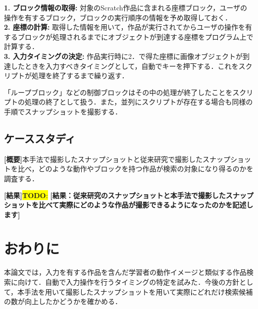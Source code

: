 \documentclass[uplatex,dvipdfmx,a4paper,twocolumn,base=11pt,jbase=11pt,ja=standard]{bxjsarticle}  %
\newcommand{\todo}[1]{\colorbox{yellow}{{\bf TODO}:}{\color{red} {\textbf{[#1]}}}}
\begin{document}
\noindent\textbf{1. ブロック情報の取得: }対象のScratch作品に含まれる座標ブロック，ユーザの操作を有するブロック，ブロックの実行順序の情報を予め取得しておく．\\
\noindent\textbf{2. 座標の計算: }取得した情報を用いて，作品が実行されてからユーザの操作を有するブロックが処理されるまでにオブジェクトが到達する座標をプログラム上で計算する．\\
\noindent\textbf{3. 入力タイミングの決定: }作品実行時に2．で得た座標に画像オブジェクトが到達したときを入力すべきタイミングとして，自動でキーを押下する．これをスクリプトが処理を終了するまで繰り返す．

「ループブロック」などの制御ブロックはその中の処理が終了したことをスクリプトの処理の終了として扱う．また，並列にスクリプトが存在する場合も同様の手順でスナップショットを撮影する．

\subsection{ケーススタディ}

\noindent\textbf{[概要]}本手法で撮影したスナップショットと従来研究で撮影したスナップショットを比べ，どのような動作やブロックを持つ作品が検索の対象になり得るのかを調査する．

\noindent\textbf{[結果]}\todo{結果：従来研究のスナップショットと本手法で撮影したスナップショットを比べて実際にどのような作品が撮影できるようになったのかを記述します}



\section{おわりに}

本論文では，入力を有する作品を含んだ学習者の動作イメージと類似する作品検索に向けて．自動で入力操作を行うタイミングの特定を試みた．今後の方針として，本手法を用いて撮影したスナップショットを用いて実際にどれだけ検索候補の数が向上したかどうかを確かめる．
\end{document}
